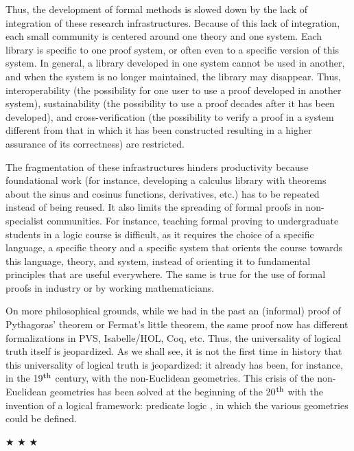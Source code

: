 Thus, the development of formal methods is slowed down by the lack of
integration of these research infrastructures.  Because of this lack
of integration, each small community is centered around one theory and
one system. Each library is specific to one proof system, or often
even to a specific version of this system. In general, a library
developed in one system cannot be used in another, and when the system
is no longer maintained, the library may disappear.  Thus,
interoperability (the possibility for one user to use a proof
developed in another system), sustainability (the possibility to use a
proof decades after it has been developed), and cross-verification
(the possibility to verify a proof in a system different from that in
which it has been constructed resulting in a higher assurance of its
correctness) are restricted.

The fragmentation of these infrastructures hinders productivity
because foundational work (for instance, developing a calculus library
with theorems about the sinus and cosinus functions, derivatives,
etc.) has to be repeated instead of being reused.  It also limits the
spreading of formal proofs in non-specialist communities. For
instance, teaching formal proving to undergraduate students in a logic
course is difficult, as it requires the choice of a specific language,
a specific theory and a specific system that orients the course
towards this language, theory, and system, instead of orienting it to
fundamental principles that are useful everywhere. The same is true
for the use of formal proofs in industry or by working mathematicians.

On more philosophical grounds, while we had in the past an (informal)
proof of Pythagoras' theorem or Fermat's little theorem, the same
proof now has different formalizations in PVS, Isabelle/HOL, Coq, etc.
Thus, the universality of logical truth itself is jeopardized.  As we
shall see, it is not the first time in history that this universality
of logical truth is jeopardized: it already has been, for instance, in the
19$^{\mbox{\footnotesize th}}$ century, with the non-Euclidean
geometries. This crisis of the non-Euclidean geometries has been
solved at the beginning of the 20$^{\mbox{\footnotesize th}}$ with the
invention of a logical framework: predicate logic
\cite{HilbertAckermann}, in which the various geometries could be
defined.

\begin{center}
$\bigstar$ $\bigstar$ $\bigstar$
\end{center}

